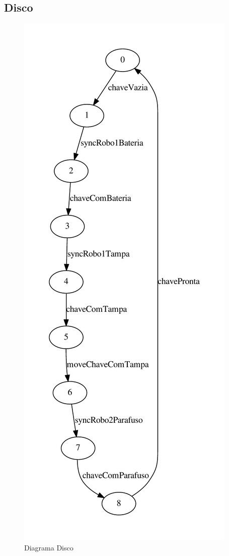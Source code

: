 \documentclass[a4paper,11pt,twocolumns]{article}
\begin{document}
\subsection{Disco}
\begin{figure}[H]
    \centering
    \includegraphics[height = 0.90\textheight]{./img/g_disco.pdf}
    \caption{Diagrama Disco}
    \label{fig:g_disco}
\end{figure}
\end{document}
